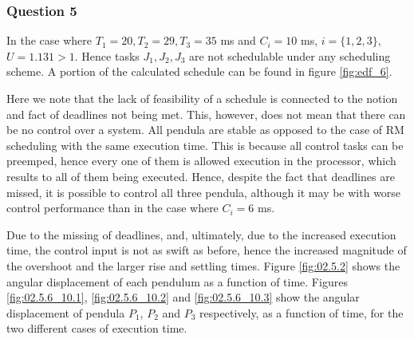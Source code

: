 \subsubsection{Question 5}
In the case where $T_1 = 20, T_2 = 29, T_3 = 35$ ms and $C_i = 10$ ms,
$i=\{1,2,3\}$, $U=1.131 > 1$. Hence tasks $J_1, J_2, J_3$ are not schedulable
under any scheduling scheme. A portion of the calculated schedule can be found
in figure \ref{fig:edf_6}.

Here we note that the lack of feasibility of a schedule is connected to the
notion and fact of deadlines not being met. This, however, does not mean that
there can be no control over a system. All pendula are stable as opposed to the
case of RM scheduling with the same execution time. This is because all control
tasks can be preemped, hence every one of them is allowed execution in the
processor, which results to all of them being executed. Hence, despite the fact
that deadlines are missed, it is possible to control all three pendula, although
it may be with worse control performance than in the case where $C_i = 6$ ms.

Due to the missing of deadlines, and, ultimately, due to the increased execution
time, the control input is not as swift as before, hence the increased magnitude
of the overshoot and the larger rise and settling times. Figure \ref{fig:02.5.2}
shows the angular displacement of each pendulum as a function of time.
Figures \ref{fig:02.5.6_10.1}, \ref{fig:02.5.6_10.2} and \ref{fig:02.5.6_10.3}
show the angular displacement of pendula $P_1$, $P_2$ and $P_3$ respectively, as
a function of time, for the two different cases of execution time.

\noindent{}


